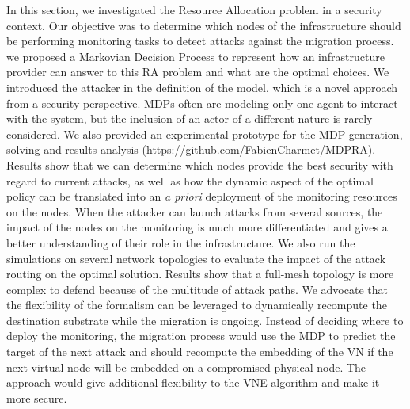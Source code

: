 \label{sec:mdp-conclusion}
In this section, we investigated the Resource Allocation problem in a security context. Our objective was to determine which nodes of the infrastructure should be performing monitoring tasks to detect attacks against the migration process.
we proposed a Markovian Decision Process to represent how an infrastructure provider can answer to this RA problem and what are the optimal choices.
We introduced the attacker in the definition of the model, which is a novel approach from a security perspective. MDPs often are modeling only one agent to interact with the system, but the inclusion of an actor of a different nature is rarely considered.
We also provided an experimental prototype for the MDP generation, solving and results analysis  (\url{https://github.com/FabienCharmet/MDPRA}).
Results show that we can determine which nodes provide the best security with regard to current attacks, as well as how the dynamic aspect of the optimal policy can be translated into an \textit{a priori} deployment of the monitoring resources on the nodes.
When the attacker can launch attacks from several sources, the impact of the nodes on the monitoring is much more differentiated and gives a better understanding of their role in the infrastructure.
We also run the simulations on several network topologies to evaluate the impact of the attack routing on the optimal solution. Results show that a full-mesh topology is more complex to defend because of the multitude of attack paths.
We advocate that the flexibility of the formalism can be leveraged to dynamically recompute the destination substrate while the migration is ongoing.
Instead of deciding where to deploy the monitoring, the migration process would use the MDP to predict the target of the next attack and should recompute the embedding of the VN if the next virtual node will be embedded on a compromised physical node. The approach would give additional flexibility to the VNE algorithm and make it more secure.

